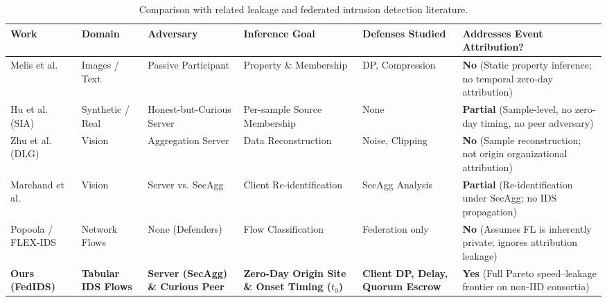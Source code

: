 \begin{table}[t]
\centering
\small
\caption{Comparison with related leakage and federated intrusion detection literature.}
\label{tab:related_work}
\begin{tabular}{lp{2.4cm}p{2.6cm}p{2.6cm}p{2.2cm}p{3.2cm}}
\toprule
\textbf{Work} & \textbf{Domain} & \textbf{Adversary} & \textbf{Inference Goal} & \textbf{Defenses Studied} & \textbf{Addresses Event Attribution?} \\
\midrule
Melis et al.~\cite{melis2019} & Images / Text & Passive Participant & Property \& Membership & DP, Compression & \textbf{No} (Static property inference; no temporal zero-day attribution) \\
Hu et al. (SIA)~\cite{hu2021} & Synthetic / Real & Honest-but-Curious Server & Per-sample Source Membership & None & \textbf{Partial} (Sample-level, no zero-day timing, no peer adversary) \\
Zhu et al. (DLG)~\cite{zhu2019} & Vision & Aggregation Server & Data Reconstruction & Noise, Clipping & \textbf{No} (Sample reconstruction; not origin organizational attribution) \\
Marchand et al.~\cite{marchand2023} & Vision & Server vs. SecAgg & Client Re-identification & SecAgg Analysis & \textbf{Partial} (Re-identification under SecAgg; no IDS propagation) \\
Popoola / FLEX-IDS~\cite{popoola2022} & Network Flows & None (Defenders) & Flow Classification & Federation only & \textbf{No} (Assumes FL is inherently private; ignores attribution leakage) \\
\midrule
\textbf{Ours (FedIDS)} & \textbf{Tabular IDS Flows} & \textbf{Server (SecAgg) \& Curious Peer} & \textbf{Zero-Day Origin Site \& Onset Timing ($t_0$)} & \textbf{Client DP, Delay, Quorum Escrow} & \textbf{Yes} (Full Pareto speed--leakage frontier on non-IID consortia) \\
\bottomrule
\end{tabular}
\end{table}
